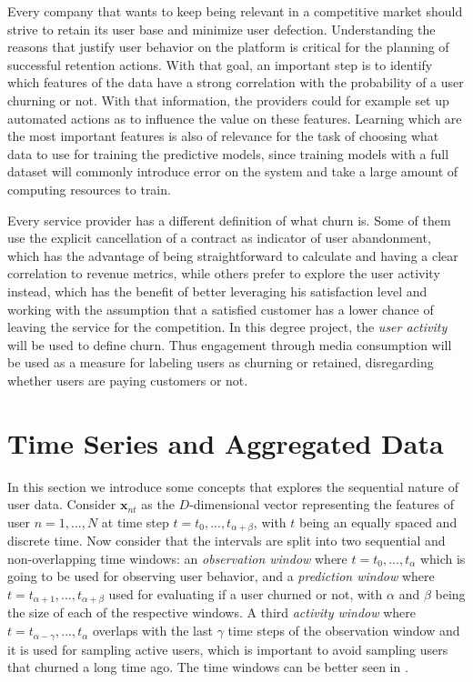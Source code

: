\documentclass{kththesis}
\begin{document}
Every company that wants to keep being relevant in a competitive market should strive to retain its user base and minimize user defection. Understanding the reasons that justify user behavior on the platform is critical for the planning of successful retention actions. With that goal, an important step is to identify which features of the data have a strong correlation with the probability of a user churning or not. With that information, the providers could for example set up automated actions as to influence the value on these features. Learning which are the most important features is also of relevance for the task of choosing what data to use for training the predictive models, since training models with a full dataset will commonly introduce error on the system and take a large amount of computing resources to train.

Every service provider has a different definition of what churn is. Some of them use the explicit cancellation of a contract as indicator of user abandonment, which has the advantage of being straightforward to calculate and having a clear correlation to revenue metrics, while others prefer to explore the user activity instead, which has the benefit of better leveraging his satisfaction level and working with the assumption that a satisfied customer has a lower chance of leaving the service for the competition. In this degree project, the \emph{user activity} will be used to define churn. Thus engagement through media consumption will be used as a measure for labeling users as churning or retained, disregarding whether users are paying customers or not.

\section{Time Series and Aggregated Data}
\label{sec:timewindows}

In this section we introduce some concepts that explores the sequential nature of user data. Consider $\mathbf{x}_{nt}$ as the $D$-dimensional vector representing the features of user $n=1,...,N$ at time step $t = t_0,...,t_{\alpha+\beta}$, with $t$ being an equally spaced and discrete time. Now consider that the intervals are split into two sequential and non-overlapping time windows: an \emph{observation window} where $t = t_0,...,t_\alpha$ which is going to be used for observing user behavior, and a \emph{prediction window} where $t = t_{\alpha+1},...,t_{\alpha+\beta}$ used for evaluating if a user churned or not, with $\alpha$ and $\beta$ being the size of each of the respective windows. A third \emph{activity window} where $t=t_{\alpha-\gamma},...,t_\alpha$ overlaps with the last $\gamma$ time steps of the observation window and it is used for sampling active users, which is important to avoid sampling users that churned a long time ago. The time windows can be better seen in .
\end{document}
